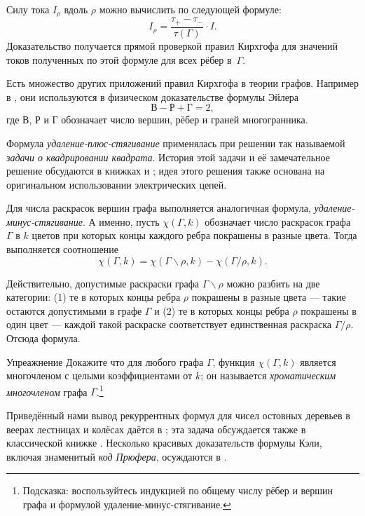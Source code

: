 \documentclass{article}
\begin{document}
Силу тока $I_\rho$ вдоль $\rho$ можно вычислить по следующей формуле:
\[I_\rho=\frac{\tau_+-\tau_-}{\tau(\Gamma)}\cdot I.\]
Доказательство получается прямой проверкой правил Кирхгофа для значений токов полученных по этой формуле для всех рёбер в~$\Gamma$.

Есть множество других приложений правил Кирхгофа в теории графов. 
Например в \cite{levi}, они используются в физическом доказательстве формулы Эйлера
\[\text{В}-\text{Р}+\text{Г}=2,\]
где $\text{В}$, $\text{Р}$ и $\text{Г}$ обозначает число вершин, рёбер и граней многогранника.

Формула \emph{удаление-плюс-стягивание} применялась при решении так называемой \emph{задачи о квадрировании квадрата}.
История этой задачи и её замечательное решение обсудаются в книжках \cite{yaglom} и \cite[Глава 32]{gardner};
идея этого решения также основана на оригинальном использовании электрических цепей.

Для числа раскрасок вершин графа выполняется аналогичная формула, \emph{удаление-минус-стягивание}.
А именно, пусть $\chi(\Gamma,k)$ обозначает число раскрасок графа $\Gamma$ в $k$ цветов при которых концы каждого ребра покрашены в разные цвета.
Тогда выполняется соотношение
\[\chi(\Gamma,k)=\chi(\Gamma\backslash\rho,k)-\chi(\Gamma/\rho,k).\]

Действительно, допустимые раскраски графа $\Gamma\backslash\rho$ можно разбить на две категории: (1) те в которых концы ребра $\rho$ покрашены в разные цвета --- такие остаются допустимыми в графе $\Gamma$ и (2) те в которых концы ребра $\rho$ покрашены в один цвет --- каждой такой раскраске соответствует единственная раскраска $\Gamma/\rho$.
Отсюда формула.

\begin{thm}{Упреажнение}
Докажите что для любого графа $\Gamma$, функция $\chi(\Gamma,k)$ является многочленом с целыми коэффициентами от $k$;
он называется \emph{хроматическим многочленом} графа $\Gamma$.\footnote{Подсказка: воспользуйтесь индукцией по общему числу рёбер и вершин графа и формулой удаление-минус-стягивание.}
\end{thm}




Приведённый нами вывод рекуррентных формул для чисел ос\-тов\-ных деревьев в веерах лестницах и колёсах даётся в \cite{haghighi-bibak};
эта задача обсуждается также в классической книжке \cite{knut}.
Несколько красивых доказательств формулы Кэли, включая знаменитый \emph{код Прюфера}, осуждаются в \cite[Глава 30]{aigner-ziegler}.
\end{document}
